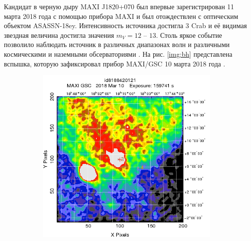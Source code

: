 	Кандидат в черную дыру MAXI J1820+070 был впервые зарегистрирован 11 марта 2018 года с помощью прибора MAXI и был отождествлен с оптическим объектом ASASSN-18ey. Интенсивность источника достигла 3 Crab и её видимая звездная величина достигла значения $m_{V} = 12$ -- $13$. Столь яркое событие позволило наблюдать источник в различных диапазонах волн и различными космическими и наземными обсерваториями \cite{veledinaa.2018}. На рис. \ref{img:bh} представлена вспышка, которую зафиксировал прибор MAXI/GSC 10 марта 2018 года \cite{alert}.
	
	\begin{figure}[h!]
		\centering
			\begin{subfigure}[b]{0.49\linewidth}
			\includegraphics[width = \textwidth]{pictures/maxij_image_full.png}
			\caption{}
			\label{img:bhfull}
		\end{subfigure}
		\begin{subfigure}[b]{0.49\linewidth}
		\centering

\end{subfigure}
\end{figure}
